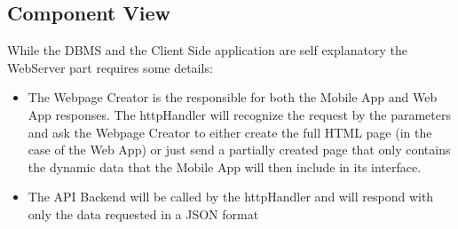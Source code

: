 \documentclass{article}
\begin{document}
\subsection{Component View}
\begin{figure}[H]
\end{figure}
	  While the DBMS and the Client Side application are self explanatory the WebServer part requires some details:
	  \begin{itemize}
			  \item The Webpage Creator is the responsible for both the Mobile App and Web App responses. The httpHandler will recognize the request by the parameters and ask the Webpage Creator to either create the full HTML page (in the case of the Web App) or just send a partially created page that only contains the dynamic data that the Mobile App will then include in its interface.
			  \item The API Backend will be called by the httpHandler and will respond with only the data requested in a JSON format
	  \end{itemize}
\end{document}

